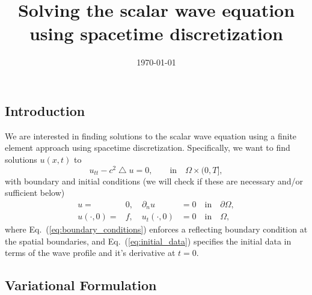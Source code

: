 \documentclass[nofootinbib,preprintnumbers,superscriptaddress,notitlepage]{revtex4-1}
\newcommand{\<}{\begin{equation}}
\newcommand{\?}{\end{equation}}
\begin{document}
\title{Solving the scalar wave equation using spacetime discretization}
\date{\today}
\maketitle

\subsection{Introduction}

We are interested in finding solutions to the scalar wave equation using a 
finite element approach using spacetime discretization. Specifically, we want
to find solutions $u(x, t)$ to
\begin{equation}
\label{eq:wave_equation}
u_{tt} - c^2 \bigtriangleup u = 0, \qquad \text{in} \quad \Omega \times (0, T],
\end{equation}
with boundary and initial conditions (we will check if these are necessary
and/or sufficient below)
\begin{eqnarray}
\label{eq:boundary_conditions}
u =& 0,\quad \partial_{n} u &= 0 \quad \text{in} \quad \partial\Omega,\\
\label{eq:initial_data}
u(\cdot, 0) =& f,\quad u_t(\cdot, 0) &=  0 \quad \text{in} \quad \Omega,
\end{eqnarray}
where Eq.~(\ref{eq:boundary_conditions}) enforces a reflecting boundary
condition at the spatial boundaries, and Eq.~(\ref{eq:initial_data}) specifies
the initial data in terms of the wave profile and it's derivative at $t=0$.\\

\subsection{Variational Formulation}
\end{document}
